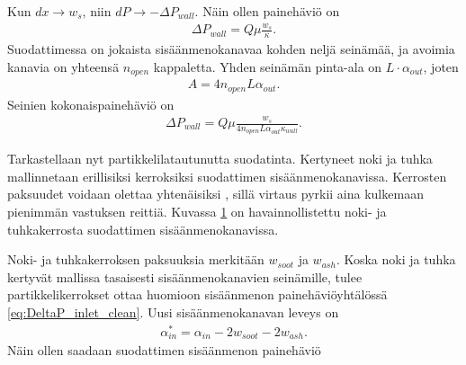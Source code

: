 Kun \(dx \to w_s\), niin \(dP \to -\Delta P_{wall}\). Näin ollen painehäviö on
\begin{align}
    \Delta P_{wall} = Q\mu \frac{w_s}{\kappa}.
\end{align}
Suodattimessa on jokaista sisäänmenokanavaa kohden neljä seinämää, ja avoimia kanavia on yhteensä \(n_{open}\) kappaletta. Yhden seinämän pinta-ala on \(L\cdot \alpha_{out}\), joten 
\begin{align}
    A = 4 n_{open} L \alpha_{out}.
\end{align}
Seinien kokonaispainehäviö on
\begin{align}
    \Delta P_{wall} =  Q \mu \frac{w_s}{4 n_{open} L  \alpha_{out}  \kappa_{wall}}.
\end{align}

Tarkastellaan nyt partikkelilatautunutta suodatinta.
Kertyneet noki ja tuhka mallinnetaan erillisiksi kerroksiksi suodattimen sisäänmenokanavissa. Kerrosten paksuudet voidaan  olettaa yhtenäisiksi \cite{Konstandopoulos2000}, sillä virtaus pyrkii aina kulkemaan pienimmän vastuksen reittiä. Kuvassa \ref{fig:hac_dpf_loaded} on havainnollistettu noki- ja tuhkakerrosta suodattimen sisäänmenokanavissa.
\begin{figure}[H]
    \centering 
               {}
    \caption{}
    \label{fig:hac_dpf_loaded}
\end{figure}
Noki- ja tuhkakerroksen paksuuksia merkitään \(w_{soot}\) ja \(w_{ash}\).
Koska noki ja tuhka kertyvät mallissa tasaisesti sisäänmenokanavien seinämille, tulee partikkelikerrokset ottaa huomioon sisäänmenon painehäviöyhtälössä \eqref{eq:DeltaP_inlet_clean}. Uusi sisäänmenokanavan leveys on 
\begin{align}
    \alpha_{in}^* = \alpha_{in} -2w_{soot}-2w_{ash}.
\end{align}
Näin ollen saadaan suodattimen sisäänmenon painehäviö
